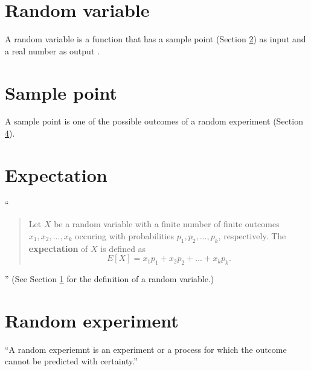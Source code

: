 \documentclass{article}
\begin{document}
\section{Random variable} \label{randomVariable}
A random variable is a function that has a sample point (Section \ref{samplePoint}) as input and a real number as output \cite{randomVariable}.
\section{Sample point} \label{samplePoint}
A sample point is one of the possible outcomes of a random experiment (Section \ref{randomExperiment}). \cite{samplePoint}
\section{Expectation} \label{expectation}
``
\begin{quote}
Let $X$ be a random variable with a finite number of finite outcomes $x_1, x_2, ... , x_k$ occuring with probabilities $p_1, p_2, ..., p_k$, respectively.  The \textbf{expectation} of $X$ is defined as
\[E[X] = x_1p_1 + x_2p_2 + ... + x_kp_k.\]
\end{quote}
''
\cite{wpExpectedValue} 
(See Section \ref{randomVariable} for the definition of a random variable.)
\section{Random experiment} \label{randomExperiment}
``A random experiemnt is an experiment or a process for which the outcome cannot be predicted with certainty.'' \cite{randomExperiment}
\printbibliography
\end{document}
